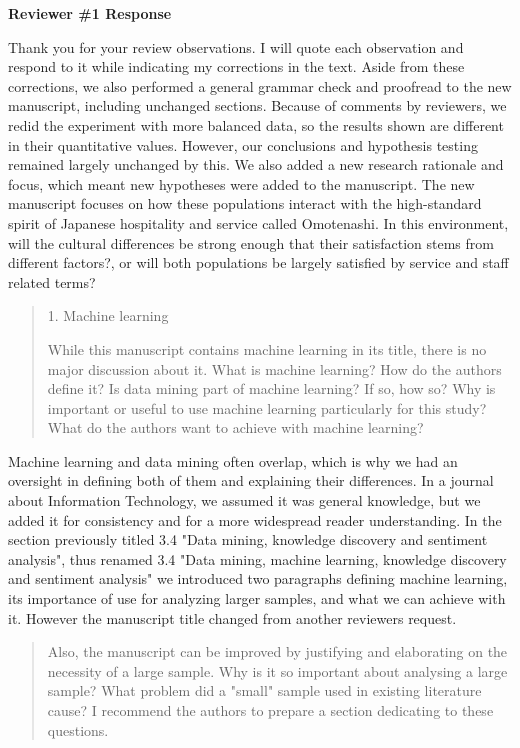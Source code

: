 \documentclass{letter}
\begin{document}

\textbf{Reviewer \#1 Response}

Thank you for your review observations. I will quote each observation and respond to it while indicating my corrections in the text.
Aside from these corrections, we also performed a general grammar check and proofread to the new manuscript, including unchanged sections. Because of comments by reviewers, we redid the experiment with more balanced data, so the results shown are different in their quantitative values. However, our conclusions and hypothesis testing remained largely unchanged by this. We also added a new research rationale and focus, which meant new hypotheses were added to the manuscript. The new manuscript focuses on how these populations interact with the high-standard spirit of Japanese hospitality and service called Omotenashi. In this environment, will the cultural differences be strong enough that their satisfaction stems from different factors?, or will both populations be largely satisfied by service and staff related terms?

\begin{quotation}
1. Machine learning

While this manuscript contains machine learning in its title, there is no major discussion about it. What is machine learning? How do the authors define it? Is data mining part of machine learning? If so, how so? Why is important or useful to use machine learning particularly for this study? What do the authors want to achieve with machine learning?  
\end{quotation}


Machine learning and data mining often overlap, which is why we had an oversight in defining both of them and explaining their differences. In a journal about Information Technology, we assumed it was general knowledge, but we added it for consistency and for a more widespread reader understanding. In the section previously titled 3.4 "Data mining, knowledge discovery and sentiment analysis", thus renamed 3.4 "Data mining, machine learning, knowledge discovery and sentiment analysis" we introduced two paragraphs defining machine learning, its importance of use for analyzing larger samples, and what we can achieve with it. However the manuscript title changed from another reviewers request.

\begin{quotation}
Also, the manuscript can be improved by justifying and elaborating on the necessity of a large sample. Why is it so important about analysing a large sample? What problem did a "small" sample used in existing literature cause? 
I recommend the authors to prepare a section dedicating to these questions.
\end{quotation}
\end{document}
